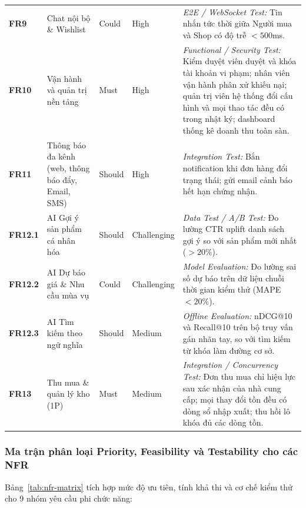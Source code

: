 \begin{longtable}{L{1.52cm} L{4.20cm} >{\centering\arraybackslash}p{1.65cm} >{\centering\arraybackslash}p{2.00cm} L{4.82cm}}
\textbf{FR9} & Chat nội bộ \& Wishlist & Could & High & \textit{E2E / WebSocket Test:} Tin nhắn tức thời giữa Người mua và Shop có độ trễ $< 500$ms. \\
\textbf{FR10} & Vận hành và quản trị nền tảng & Must & High & \textit{Functional / Security Test:} Kiểm duyệt viên duyệt và khóa tài khoản vi phạm; nhân viên vận hành phân xử khiếu nại; quản trị viên hệ thống đổi cấu hình và mọi thao tác đều có trong nhật ký; dashboard thống kê doanh thu toàn sàn. \\
\textbf{FR11} & Thông báo đa kênh (web, thông báo đẩy, Email, SMS) & Should & High & \textit{Integration Test:} Bắn notification khi đơn hàng đổi trạng thái; gửi email cảnh báo hết hạn chứng nhận. \\
\textbf{FR12.1} & AI Gợi ý sản phẩm cá nhân hóa & Should & Challenging & \textit{Data Test / A/B Test:} Đo lường CTR uplift danh sách gợi ý so với sản phẩm mới nhất ($> 20\%$). \\
\textbf{FR12.2} & AI Dự báo giá \& Nhu cầu mùa vụ & Could & Challenging & \textit{Model Evaluation:} Đo lường sai số dự báo trên dữ liệu chuỗi thời gian kiểm thử (MAPE $< 20\%$). \\
\textbf{FR12.3} & AI Tìm kiếm theo ngữ nghĩa & Should & Medium & \textit{Offline Evaluation:} nDCG@10 và Recall@10 trên bộ truy vấn gán nhãn tay, so với tìm kiếm từ khóa làm đường cơ sở. \\
\textbf{FR13} & Thu mua \& quản lý kho (1P) & Must & Medium & \textit{Integration / Concurrency Test:} Đơn thu mua chỉ hiệu lực sau xác nhận của nhà cung cấp; mọi thay đổi tồn đều có dòng sổ nhập xuất; thu hồi lô khóa đủ các dòng tồn. \\
\end{longtable}
\endgroup
\subsubsection*{Ma trận phân loại Priority, Feasibility và Testability cho các NFR}
\label{subsec:nfr-matrix}

Bảng~\ref{tab:nfr-matrix} tích hợp mức độ ưu tiên, tính khả thi và cơ chế kiểm thử cho 9 nhóm yêu cầu phi chức năng:

